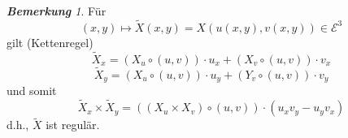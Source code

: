 \documentclass[a4paper,oneside,11pt,DIV=12,parskip=half]{scrartcl}
\newcommand{\E}{\mathcal E}
\theoremstyle{plain}
\theoremstyle{definition}
\newtheorem{remark, definition}[theorem]{Bemerkung und Definition.}
\newtheorem{lemma, definition}[theorem]{Lemma und Definition.}
\theoremstyle{remark}
\newtheorem*{remark}{\textbf{Bemerkung}}
\newtheorem*{remark, example}{\textbf{Bemerkung und Beispiel}}
\begin{document}
\begin{remark}
	
	Für \[(x,y)\mapsto \widetilde{X}(x,y) = X(u(x,y),v(x,y)) \in \E^3  \] gilt (Kettenregel) \[ \widetilde{X}_x = (X_u\circ (u,v))\cdot u_x + (X_v \circ (u,v)) \cdot v_x \]
	\[ \widetilde{X}_y = (X_u \circ (u,v))\cdot u_y + (Y_v \circ (u,v)) \cdot v_y \]
	und somit 
	\[ \widetilde{X}_x \times \widetilde{X}_y = ((X_u\times X_v)\circ (u,v))\cdot (u_xv_y - u_yv_x) \] d.h., $ \widetilde{X} $ ist regulär.
	
\end{remark}
\end{document}
